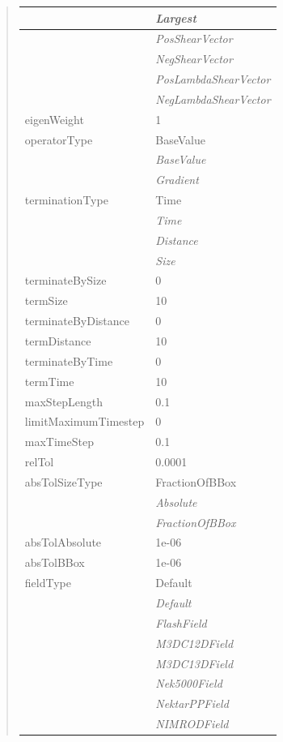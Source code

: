 \documentclass[letterpaper,10pt,english]{sphinxmanual}
\begin{document}
\begin{quote}
\begin{longtable}{|l|l|}
\hline & 
\emph{Largest}
\\
\hline & 
\emph{PosShearVector}
\\
\hline & 
\emph{NegShearVector}
\\
\hline & 
\emph{PosLambdaShearVector}
\\
\hline & 
\emph{NegLambdaShearVector}
\\
\hline
eigenWeight
 & 
1
\\
\hline
operatorType
 & 
BaseValue
\\
\hline & 
\emph{BaseValue}
\\
\hline & 
\emph{Gradient}
\\
\hline
terminationType
 & 
Time
\\
\hline & 
\emph{Time}
\\
\hline & 
\emph{Distance}
\\
\hline & 
\emph{Size}
\\
\hline
terminateBySize
 & 
0
\\
\hline
termSize
 & 
10
\\
\hline
terminateByDistance
 & 
0
\\
\hline
termDistance
 & 
10
\\
\hline
terminateByTime
 & 
0
\\
\hline
termTime
 & 
10
\\
\hline
maxStepLength
 & 
0.1
\\
\hline
limitMaximumTimestep
 & 
0
\\
\hline
maxTimeStep
 & 
0.1
\\
\hline
relTol
 & 
0.0001
\\
\hline
absTolSizeType
 & 
FractionOfBBox
\\
\hline & 
\emph{Absolute}
\\
\hline & 
\emph{FractionOfBBox}
\\
\hline
absTolAbsolute
 & 
1e-06
\\
\hline
absTolBBox
 & 
1e-06
\\
\hline
fieldType
 & 
Default
\\
\hline & 
\emph{Default}
\\
\hline & 
\emph{FlashField}
\\
\hline & 
\emph{M3DC12DField}
\\
\hline & 
\emph{M3DC13DField}
\\
\hline & 
\emph{Nek5000Field}
\\
\hline & 
\emph{NektarPPField}
\\
\hline & 
\emph{NIMRODField}
\\
\hline

\end{longtable}
\end{quote}
\end{document}
